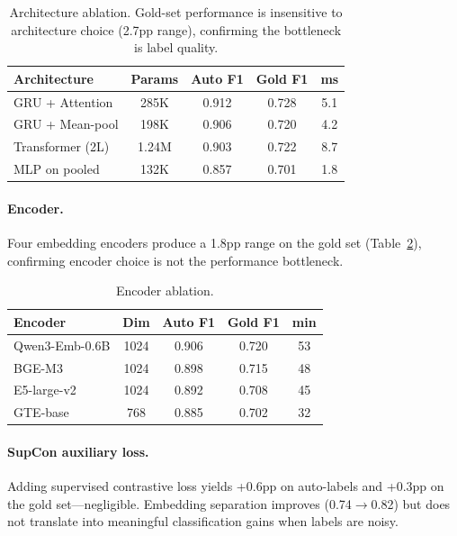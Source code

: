 \documentclass[11pt,a4paper]{article}
\begin{document}
\begin{table}[t]
\centering
\small
\begin{tabular}{lcccc}
\toprule
\textbf{Architecture} & \textbf{Params} & \textbf{Auto F1} & \textbf{Gold F1} & \textbf{ms} \\
\midrule
GRU + Attention & 285K & 0.912 & 0.728 & 5.1 \\
GRU + Mean-pool & 198K & 0.906 & 0.720 & 4.2 \\
Transformer (2L) & 1.24M & 0.903 & 0.722 & 8.7 \\
MLP on pooled & 132K & 0.857 & 0.701 & 1.8 \\
\bottomrule
\end{tabular}
\caption{Architecture ablation. Gold-set performance is insensitive to architecture choice (2.7pp range), confirming the bottleneck is label quality.}
\label{tab:arch-ablation}
\end{table}

\paragraph{Encoder.}
Four embedding encoders produce a 1.8pp range on the gold set (Table~\ref{tab:encoder-ablation}), confirming encoder choice is not the performance bottleneck.

\begin{table}[t]
\centering
\small
\begin{tabular}{lcccc}
\toprule
\textbf{Encoder} & \textbf{Dim} & \textbf{Auto F1} & \textbf{Gold F1} & \textbf{min} \\
\midrule
Qwen3-Emb-0.6B & 1024 & 0.906 & 0.720 & 53 \\
BGE-M3 & 1024 & 0.898 & 0.715 & 48 \\
E5-large-v2 & 1024 & 0.892 & 0.708 & 45 \\
GTE-base & 768 & 0.885 & 0.702 & 32 \\
\bottomrule
\end{tabular}
\caption{Encoder ablation.}
\label{tab:encoder-ablation}
\end{table}

\paragraph{SupCon auxiliary loss.}
Adding supervised contrastive loss yields +0.6pp on auto-labels and +0.3pp on the gold set---negligible.
Embedding separation improves (0.74$\to$0.82) but does not translate into meaningful classification gains when labels are noisy.
\end{document}
